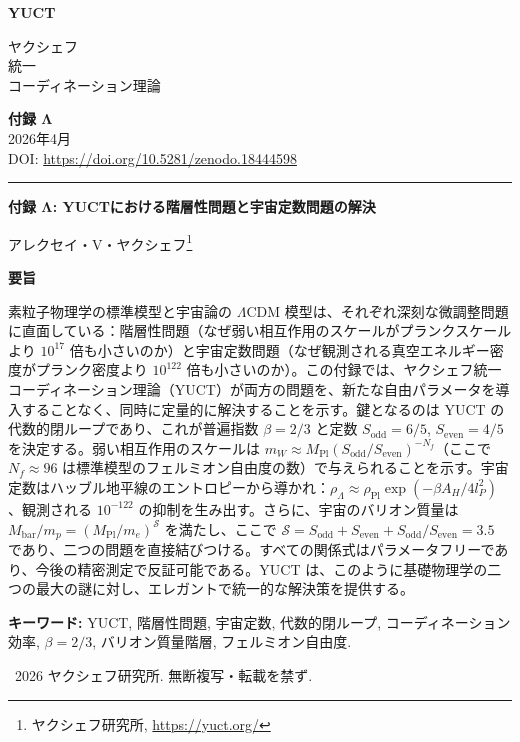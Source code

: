 \documentclass[11pt,a4paper]{article}
\theoremstyle{remark}
\newcommand{\makeheader}{%
	\noindent
	\begin{minipage}{0.17\textwidth}
		\raggedright
		{\sffamily\bfseries\color{skyblue}\fontsize{46}{46}\selectfont YUCT}%
	\end{minipage}%
	\hspace{30pt}
	\begin{minipage}{0.32\textwidth}
		\raggedright
		{\sffamily\fontsize{11}{13}\selectfont ヤクシェフ\\ 統一\\ コーディネーション理論}%
	\end{minipage}%
	\hfill
	\begin{minipage}{0.38\textwidth}
		\raggedleft
		{\sffamily\bfseries 付録 Λ}\\
		{\sffamily 2026年4月}\\
		{\sffamily\footnotesize DOI: \url{https://doi.org/10.5281/zenodo.18444598}}%
	\end{minipage}
	\par\vspace{5pt}
	\noindent\textcolor{gold}{\rule{\textwidth}{1.6pt}}
	\par\vspace{0pt}
}
\begin{document}
	\renewcommand{\thepage}{\arabic{page}}
	\thispagestyle{firstpage}
	\makeheader
	
	\vspace{0cm}
	{\LARGE\bfseries 付録 Λ: YUCTにおける階層性問題と宇宙定数問題の解決 \par}
	\vspace{0.2cm}
	
	{\large アレクセイ・V・ヤクシェフ\footnote{ヤクシェフ研究所, \url{https://yuct.org/}}} \\
	\vspace{0.0cm}
	
	{\color{darkblue}\textbf{\LARGE 要旨}} \par
	{\large
		\noindent
		素粒子物理学の標準模型と宇宙論の \(\Lambda\)CDM 模型は、それぞれ深刻な微調整問題に直面している：階層性問題（なぜ弱い相互作用のスケールがプランクスケールより \(10^{17}\) 倍も小さいのか）と宇宙定数問題（なぜ観測される真空エネルギー密度がプランク密度より \(10^{122}\) 倍も小さいのか）。この付録では、ヤクシェフ統一コーディネーション理論（YUCT）が両方の問題を、新たな自由パラメータを導入することなく、同時に定量的に解決することを示す。鍵となるのは YUCT の代数的閉ループであり、これが普遍指数 \(\beta = 2/3\) と定数 \(S_{\mathrm{odd}} = 6/5\), \(S_{\mathrm{even}} = 4/5\) を決定する。弱い相互作用のスケールは \(m_W \approx M_{\mathrm{Pl}} (S_{\mathrm{odd}}/S_{\mathrm{even}})^{-N_f}\)（ここで \(N_f \approx 96\) は標準模型のフェルミオン自由度の数）で与えられることを示す。宇宙定数はハッブル地平線のエントロピーから導かれ：\(\rho_\Lambda \approx \rho_{\mathrm{Pl}} \exp(-\beta A_H / 4l_P^2)\)、観測される \(10^{-122}\) の抑制を生み出す。さらに、宇宙のバリオン質量は \(M_{\mathrm{bar}}/m_p = (M_{\mathrm{Pl}}/m_e)^{\mathcal{S}}\) を満たし、ここで \(\mathcal{S} = S_{\mathrm{odd}} + S_{\mathrm{even}} + S_{\mathrm{odd}}/S_{\mathrm{even}} = 3.5\) であり、二つの問題を直接結びつける。すべての関係式はパラメータフリーであり、今後の精密測定で反証可能である。YUCT は、このように基礎物理学の二つの最大の謎に対し、エレガントで統一的な解決策を提供する。
	}
	
	\vspace{0.1cm}
	\noindent
	{\color{darkblue}\textbf{キーワード:}} YUCT, 階層性問題, 宇宙定数, 代数的閉ループ, コーディネーション効率, \(\beta = 2/3\), バリオン質量階層, フェルミオン自由度.
	
	\vspace{0.5cm}
	\noindent
	\textcopyright\ 2026 ヤクシェフ研究所. 無断複写・転載を禁ず.
	
	\tableofcontents
	\newpage
	
\end{document}
